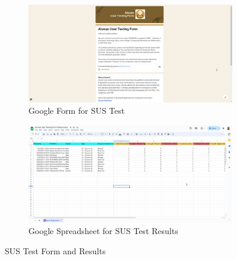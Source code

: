 \begin{figure}[h]
    \centering
    \begin{subfigure}[b]{1.0\textwidth}
        \centering
        \includegraphics[width=\textwidth]{appendices/sustestform.png}
        \caption{Google Form for SUS Test}
        \vspace{0.8cm}
        \label{fig:sub1}
    \end{subfigure}
    \hspace{0.08\textwidth}
    \begin{subfigure}[b]{1.0\textwidth}
        \centering
        \includegraphics[width=\textwidth]{appendices/susresults.png}
        \caption{Google Spreadsheet for SUS Test Results}
        \label{fig:sub2}
    \end{subfigure}
    \caption{SUS Test Form and Results}
    \label{fig:myfig85}
\end{figure}
\clearpage
